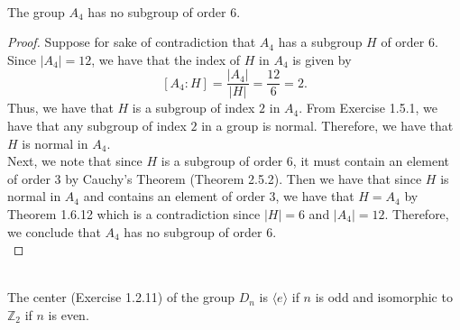 \documentclass{article}
\def\zz{{\mathbb Z}}
\begin{document}
\begin{problem}[Exercise 1.6.8] \\
    The group $A_4$ has no subgroup of order $6$.
\end{problem}

\begin{proof}
    Suppose for sake of contradiction that $A_4$ has a subgroup $H$ of order $6$. Since $|A_4| = 12$, we have that the index of $H$ in $A_4$ is given by
    \[
        [A_4 : H] = \frac{|A_4|}{|H|} = \frac{12}{6} = 2.
    \]
    Thus, we have that $H$ is a subgroup of index $2$ in $A_4$. From Exercise 1.5.1, we have that any subgroup of index $2$ in a group is normal. Therefore, we have that $H$ is normal in $A_4$. \\
    Next, we note that since $H$ is a subgroup of order $6$, it must contain an element of order $3$ by Cauchy's Theorem (Theorem 2.5.2). Then we have that since $H$ is normal in $A_4$ and contains an element of order $3$, we have that $H = A_4$ by Theorem 1.6.12 which is a contradiction since $|H| = 6$ and $|A_4| = 12$. Therefore, we conclude that $A_4$ has no subgroup of order $6$. \\
\end{proof}


\newpage
\begin{problem}[Exercise 1.6.12] \\
    The center (Exercise 1.2.11) of the group $D_n$ is $\langle e \rangle$ if $n$ is odd and isomorphic to $\zz_2$ if $n$ is even.
    
\end{problem}
\end{document}
